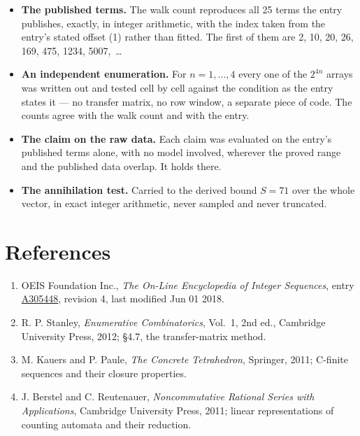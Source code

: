 \documentclass[11pt]{article}
\theoremstyle{definition}
\begin{document}
\begin{itemize}

\item {\bfseries The published terms.} The walk count reproduces all 25 terms the entry publishes, exactly, in integer arithmetic, with the index taken from the entry's stated offset (1) rather than fitted. The first of them are 2, 10, 20, 26, 169, 475, 1234, 5007,~\dots

\item {\bfseries An independent enumeration.} For $n = 1,\dots,4$ every one of the $2^{4n}$ arrays was written out and tested cell by cell against the condition as the entry states it --- no transfer matrix, no row window, a separate piece of code. The counts agree with the walk count and with the entry.

\item {\bfseries The claim on the raw data.} Each claim was evaluated on the entry's published terms alone, with no model involved, wherever the proved range and the published data overlap. It holds there.

\item {\bfseries The annihilation test.} Carried to the derived bound $S = 71$ over the whole vector, in exact integer arithmetic, never sampled and never truncated.

\end{itemize}

\section{References}

\begin{enumerate}

\item OEIS Foundation Inc., \emph{The On-Line Encyclopedia of Integer Sequences}, entry \href{https://oeis.org/A305448}{A305448}, revision 4, last modified Jun 01 2018.

\item R. P. Stanley, \emph{Enumerative Combinatorics}, Vol.~1, 2nd ed., Cambridge University Press, 2012; \S4.7, the transfer-matrix method.

\item M. Kauers and P. Paule, \emph{The Concrete Tetrahedron}, Springer, 2011; C-finite sequences and their closure properties.

\item J. Berstel and C. Reutenauer, \emph{Noncommutative Rational Series with Applications}, Cambridge University Press, 2011; linear representations of counting automata and their reduction.

\end{enumerate}
\end{document}
